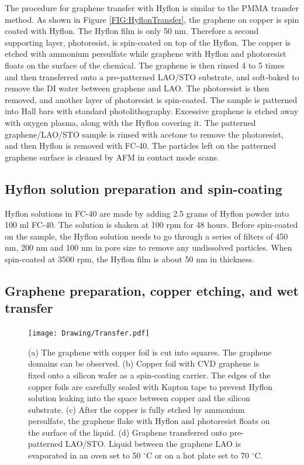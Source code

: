 \documentclass[pdflatex, sectionletters, 12pt]{pittetd}    %
\begin{document}
The procedure for graphene transfer with Hyflon is similar to the PMMA transfer method. As shown in Figure \ref{FIG:HyflonTransfer}, the graphene on copper is spin coated with Hyflon. The Hyflon film is only 50 nm. Therefore a second supporting layer, photoresist, is spin-coated on top of the Hyflon. The copper is etched with ammonium persulfate while graphene with Hyflon and photoresist floats on the surface of the chemical. The graphene is then rinsed 4 to 5 times and then transferred onto a pre-patterned LAO/STO substrate, and soft-baked to remove the DI water between graphene and LAO. The photoresist is then removed, and another layer of photoresist is spin-coated. The sample is patterned into Hall bars with standard photolithography. Excessive graphene is etched away with oxygen plasma, along with the Hyflon covering it. The patterned graphene/LAO/STO sample is rinsed with acetone to remove the photoresist, and then Hyflon is removed with FC-40. The particles left on the patterned graphene surface is cleaned by AFM in contact mode scans. 

\subsection{Hyflon solution preparation and spin-coating} 

Hyflon solutions in FC-40 are made by adding 2.5 grams of Hyflon powder into 100 ml FC-40. The solution is shaken at 100 rpm for 48 hours. Before spin-coated on the sample, the Hyflon solution needs to go through a series of filters of 450 nm, 200 nm and 100 nm in pore size to remove any undissolved particles. When spin-coated at 3500 rpm, the Hyflon film is about 50 nm in thickness. 

\subsection{Graphene preparation, copper etching, and wet transfer}

\begin{figure}[p]
	\centering
	\texttt{[image: Drawing/Transfer.pdf]}
	\caption{(a) The graphene with copper foil is cut into squares. The graphene domains can be observed. (b) Copper foil with CVD graphene is fixed onto a silicon wafer as a spin-coating carrier. The edges of the copper foils are carefully sealed with Kapton tape to prevent Hyflon solution leaking into the space between copper and the silicon substrate. (c) After the copper is fully etched by ammonium persulfate, the graphene flake with Hyflon and photoresist floats on the surface of the liquid. (d) Graphene transferred onto pre-patterned LAO/STO. Liquid between the graphene LAO is evaporated in an oven set to 50 $^{\circ}$C or on a hot plate set to 70 $^{\circ}$C.}
	\label{FIG:Transfer}
\end{figure}
\end{document}
